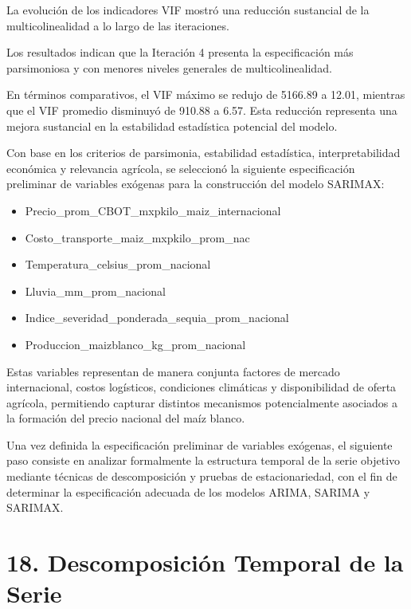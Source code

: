 \documentclass[11pt]{article}
\providecommand{\tightlist}{%
      \setlength{\itemsep}{0pt}\setlength{\parskip}{0pt}}
\begin{document}
La evolución de los indicadores VIF mostró una reducción sustancial de
la multicolinealidad a lo largo de las iteraciones.

Los resultados indican que la Iteración 4 presenta la especificación más
parsimoniosa y con menores niveles generales de multicolinealidad.

En términos comparativos, el VIF máximo se redujo de 5166.89 a 12.01,
mientras que el VIF promedio disminuyó de 910.88 a 6.57. Esta reducción
representa una mejora sustancial en la estabilidad estadística potencial
del modelo.

Con base en los criterios de parsimonia, estabilidad estadística,
interpretabilidad económica y relevancia agrícola, se seleccionó la
siguiente especificación preliminar de variables exógenas para la
construcción del modelo SARIMAX:

\begin{itemize}
\tightlist
\item
  Precio\_prom\_CBOT\_mxpkilo\_maiz\_internacional
\item
  Costo\_transporte\_maiz\_mxpkilo\_prom\_nac
\item
  Temperatura\_celsius\_prom\_nacional
\item
  Lluvia\_mm\_prom\_nacional
\item
  Indice\_severidad\_ponderada\_sequia\_prom\_nacional
\item
  Produccion\_maizblanco\_kg\_prom\_nacional
\end{itemize}

Estas variables representan de manera conjunta factores de mercado
internacional, costos logísticos, condiciones climáticas y
disponibilidad de oferta agrícola, permitiendo capturar distintos
mecanismos potencialmente asociados a la formación del precio nacional
del maíz blanco.

Una vez definida la especificación preliminar de variables exógenas, el
siguiente paso consiste en analizar formalmente la estructura temporal
de la serie objetivo mediante técnicas de descomposición y pruebas de
estacionariedad, con el fin de determinar la especificación adecuada de
los modelos ARIMA, SARIMA y SARIMAX.

    \hypertarget{descomposiciuxf3n-temporal-de-la-serie}{%
\section{18. Descomposición Temporal de la
Serie}\label{descomposiciuxf3n-temporal-de-la-serie}}
\end{document}

